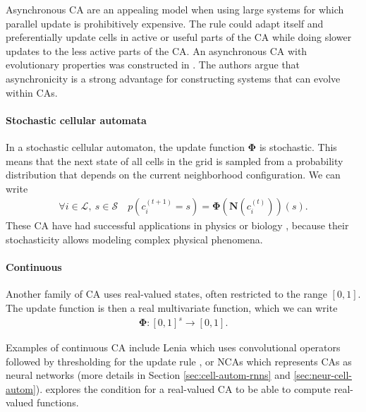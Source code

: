 Asynchronous \ac{CA} are an appealing model when using large systems for which
parallel update is prohibitively expensive. The rule could adapt itself and
preferentially update cells in active or useful parts of the \ac{CA} while doing
slower updates to the less active parts of the \ac{CA}. An asynchronous \ac{CA}
with evolutionary properties was constructed in
\parencite{nehanivEvolutionAsynchronousCellular2003}. The authors argue that
asynchronicity is a strong advantage for constructing systems that can evolve
within \acp{CA}.

\paragraph{Stochastic cellular automata}
In a stochastic cellular automaton, the update function $\boldsymbol{\Phi}$ is
stochastic. This means that the next state of all cells in the grid is
sampled from a probability distribution that depends on the current neighborhood
configuration. We can write
\begin{equation}
\begin{aligned}
  \forall i \in \mathcal{L},\ s \in \mathcal{S} \quad p\left(c_{i}^{(t + 1)} = s \right) = \boldsymbol{\Phi} \left(\boldsymbol{N}\left(c_{i}^{(t)}\right)\right)(s).
\end{aligned}
\end{equation}
These \ac{CA} have had successful applications in physics
\parencite{vichniacSimulatingPhysicsCellular1984,
  ottaviSimulationIsingModel1989} or biology
\parencite{boasCellularPottsModel2018}, because their stochasticity allows
modeling complex physical phenomena.

\paragraph{Continuous}
Another family of \ac{CA} uses real-valued states, often restricted to the range
$[0, 1]$. The update function is then a real multivariate function, which we can
write
\begin{equation}
  \begin{aligned}
  \boldsymbol{\Phi}: [0, 1]^{s} \rightarrow [0, 1].
  \end{aligned}
  \label{eq:phi_cont}
\end{equation}

Examples of continuous \ac{CA} include Lenia which uses convolutional operators
followed by thresholding for the update rule
\parencite{chanLeniaBiologyArtificial2019a}, or \acp{NCA}
\parencite{mordvintsevGrowingNeuralCellular2020} which represents \acp{CA} as
neural networks (more details in Section \ref{sec:cell-autom-rnns} and
\ref{sec:neur-cell-autom}). \textcite{garzonRealComputationCellular1993}
explores the condition for a real-valued \ac{CA} to be able to compute
real-valued functions.

